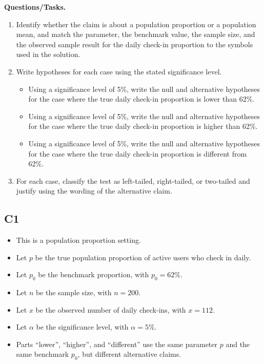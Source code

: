 		\textbf{Questions/Tasks.}
		\begin{enumerate}
			\item[(C1)] Identify whether the claim is about a population proportion or a population mean, and match the parameter, the benchmark value, the sample size, and the observed sample result for the daily check-in proportion to the symbols used in the solution.
			\item[(C2)] Write hypotheses for each case using the stated significance level.
			\begin{itemize}
				\item[(a)] Using a significance level of 5\%, write the null and alternative hypotheses for the case where the true daily check-in proportion is lower than 62\%.
				\item[(b)] Using a significance level of 5\%, write the null and alternative hypotheses for the case where the true daily check-in proportion is higher than 62\%.
				\item[(c)] Using a significance level of 5\%, write the null and alternative hypotheses for the case where the true daily check-in proportion is different from 62\%.
			\end{itemize}
			\item[(C3)] For each case, classify the test as left-tailed, right-tailed, or two-tailed and justify using the wording of the alternative claim.
		\end{enumerate}
		
		\subsection*{C1}
		\begin{itemize}
			\item This is a population proportion setting.
			\item Let \(p\) be the true population proportion of active users who check in daily.
			\item Let \(p_0\) be the benchmark proportion, with \(p_0=62\%\).
			\item Let \(n\) be the sample size, with \(n=200\).
			\item Let \(x\) be the observed number of daily check-ins, with \(x=112\).
			\item Let \(\alpha\) be the significance level, with \(\alpha=5\%\).
			\item Parts ``lower'', ``higher'', and ``different'' use the same parameter \(p\) and the same benchmark \(p_0\), but different alternative claims.
		\end{itemize}
		

